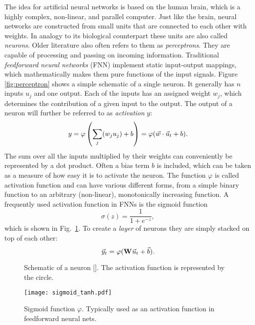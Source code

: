 The idea for artificial neural networks is based on the human brain,
which is a highly complex, non-linear, and parallel computer.  Just like the
brain, neural networks are constructed from small units that are connected to each other
with weights. In analogy to its biological counterpart these units are also
called \emph{neurons}. Older literature also often refers to them as
\emph{perceptrons}.  They are capable of processing and passing on incoming
information.
Traditional \emph{feedforward neural networks} (FNN) implement static
input-output mappings, which mathematically makes them pure functions of the
input signals. Figure \ref{fig:perceptron} shows a simple schematic of a single
neuron.  It generally has $n$ inputs $u_j$ and one output.  Each of the inputs
has an assigned weight $w_j$, which determines the contribution of a given
input to the output.  The output of a neuron will further be referred to as
\emph{activation} $y$:
\begin{equation}
  \label{eq:ffn_eq}
  y = \varphi \left( \sum_j (w_j u_j) + b  \right)
       = \varphi (\vec{w} \cdot \vec{u}_t + b).
\end{equation}
The sum over all the inputs multiplied by their weights can conveniently be
represented by a dot product.  Often a bias term $b$ is included, which can be
taken as a measure of how easy it is to activate the neuron.  The function
$\varphi$ is called activation function and can have various different forms,
from a simple binary function to an arbitrary (non-linear), monotonically
increasing function.  A frequently used activation function in FNNs is the
sigmoid function
\begin{equation}
  \sigma (z) = \frac{1}{1 + e^{-z}},
\end{equation}
which is shown in Fig.~\ref{fig:sigmoid}. To create a \emph{layer} of neurons
they are simply stacked on top of each other:
\begin{equation}
  \vec{y}_t = \varphi (\boldsymbol{\textbf{W}}^{\text{}} \vec{u}_t + \vec{b}).
\end{equation}

\begin{figure}
  \begin{minipage}{.42\textwidth}
    \centering
    \Perceptron
    \vspace{4.5mm}
    \caption{Schematic of a neuron [\cite{Nielsen2015}].
    The activation function is represented by the circle.}
    \label{fig:perceptron}
  \end{minipage}
  \hspace{.02\textwidth}
  \begin{minipage}{.54\textwidth}
    \centering
    \texttt{[image: sigmoid\_tanh.pdf]}
    \caption{Sigmoid function $\varphi$. Typically used as an activation function
    in feedforward neural nets.}
    \label{fig:sigmoid}
  \end{minipage}
\end{figure}

